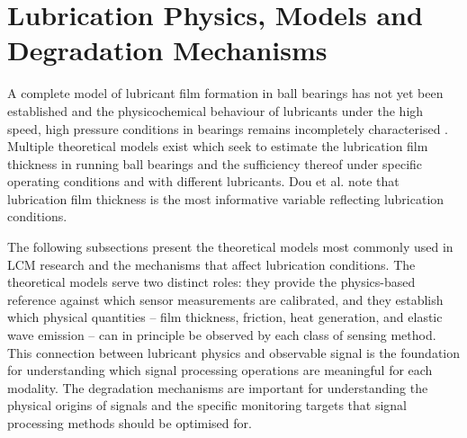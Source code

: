 \section{Lubrication Physics, Models and Degradation Mechanisms}
\label{sec:lubrication_physics}

A complete model of lubricant film formation in ball bearings has not yet been established and the physicochemical behaviour of lubricants under the high speed, high pressure conditions in bearings remains incompletely characterised \cite{cen_ehl_2021} \cite{dai_situ_2024} \cite{li_lubrication_2026}. Multiple theoretical models exist which seek to estimate the lubrication film thickness in running ball bearings and the sufficiency thereof under specific operating conditions and with different lubricants. Dou et al. \cite{dou_review_2022} note that lubrication film thickness is the most informative variable reflecting lubrication conditions.

The following subsections present the theoretical models most commonly used in LCM research and the mechanisms that affect lubrication conditions. The theoretical models serve two distinct roles: they provide the physics-based reference against which sensor measurements are calibrated, and they establish which physical quantities -- film thickness, friction, heat generation, and elastic wave emission -- can in principle be observed by each class of sensing method. This connection between lubricant physics and observable signal is the foundation for understanding which signal processing operations are meaningful for each modality. The degradation mechanisms are important for understanding the physical origins of signals and the specific monitoring targets that signal processing methods should be optimised for.

